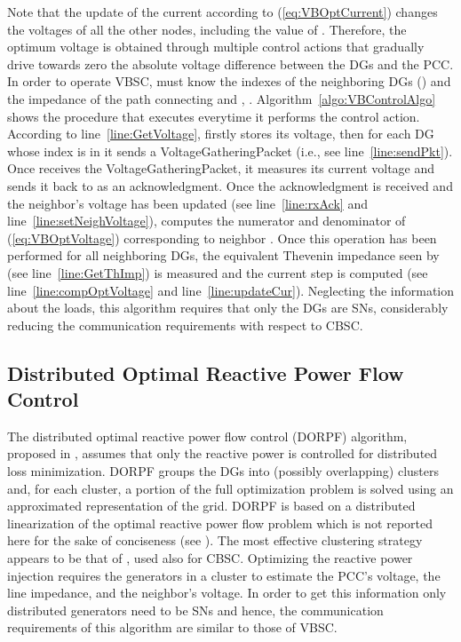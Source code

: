 \documentclass[journal]{IEEEtran}
\newcommand{\eq}[1]{(\ref{#1})}
\begin{document}
Note that the update of the current according to \eq{eq:VBOptCurrent} changes the voltages of all the other nodes, including the value of . Therefore, the optimum voltage is obtained through multiple control actions that gradually drive towards zero the absolute voltage difference between the DGs and the PCC. In order to operate VBSC,  must know the indexes of the neighboring DGs () and the impedance of the path connecting  and , . Algorithm~\ref{algo:VBControlAlgo} shows the procedure that  executes everytime it performs the control action. According to line~\ref{line:GetVoltage},   firstly  stores its voltage, then for each DG whose index is in  it sends a VoltageGatheringPacket (i.e., see line~\ref{line:sendPkt}). Once   receives the VoltageGatheringPacket, it measures its current voltage and sends it back to  as an acknowledgment. Once the acknowledgment is received and the neighbor's voltage has been updated (see line~\ref{line:rxAck} and line~\ref{line:setNeighVoltage}),  computes the numerator and denominator of \eq{eq:VBOptVoltage} corresponding to neighbor . Once this operation has been performed for all neighboring DGs, the equivalent Thevenin impedance seen by  (see line~\ref{line:GetThImp}) is measured and the current step is computed (see line~\ref{line:compOptVoltage} and line~\ref{line:updateCur}). Neglecting the information about the loads, this algorithm requires that only the DGs are SNs, considerably reducing the communication requirements with respect to CBSC.
\subsection{Distributed Optimal Reactive Power Flow Control}
\label{ssec:DORPFControl}
The distributed optimal reactive power flow control (DORPF) algorithm, proposed in \cite{DORPF}, assumes that only the reactive power is controlled for distributed loss minimization. DORPF groups the DGs into (possibly overlapping) clusters and, for each cluster,  a portion of the full optimization problem is solved using an approximated representation of the grid. DORPF is based on a distributed linearization of the optimal reactive power flow problem which is not reported here for the sake of conciseness (see \cite{DORPF}).  The most effective clustering strategy appears to be that of \cite{SurroundControl}, used also for CBSC. Optimizing the reactive power injection requires the generators in a cluster to estimate the PCC's voltage, the line impedance, and the neighbor's voltage. In order to get this information only distributed generators need to be SNs and hence, the communication requirements of this algorithm are similar to those of VBSC.
\end{document}
